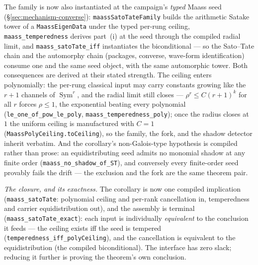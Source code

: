 \documentclass[11pt]{article}
\theoremstyle{definition}
\newcommand{\Sym}{\operatorname{Sym}}
\begin{document}
\medskip
\noindent The family is now also instantiated at the campaign's \emph{typed} Maass
seed (\S\ref{sec:mechanism-converse}): \texttt{maassSatoTateFamily} builds the
arithmetic Satake tower of a \texttt{MaassEigenData} under the typed per-rung
ceiling, \texttt{maass\_temperedness} derives part~(i) at the seed through the
compiled radial limit, and \texttt{maass\_satoTate\_iff} instantiates the
biconditional --- so the Sato--Tate chain and the automorphy chain (packages,
converse, wave-form identification) consume one and the same seed object, with the
same automorphic tower.  Both consequences are derived at their stated strength.  The ceiling enters
polynomially: the per-rung classical input may carry constants growing like the
$r{+}1$ channels of $\Sym^r$, and the radial limit still closes ---
$\rho^r\le C(r{+}1)^k$ for all $r$ forces $\rho\le1$, the exponential beating
every polynomial (\texttt{le\_one\_of\_pow\_le\_poly},
\texttt{maass\_temperedness\_poly}); once the radius closes at $1$ the uniform
ceiling is manufactured with $C=1$
(\texttt{MaassPolyCeiling.toCeiling}), so the family, the fork, and the shadow
detector inherit verbatim.  And the corollary's non-Galois-type hypothesis is
compiled rather than prose: an equidistributing seed admits no monomial shadow
at any finite order (\texttt{maass\_no\_shadow\_of\_ST}), and conversely every
finite-order seed provably fails the drift --- the exclusion and the fork are
the same theorem pair.

\smallskip
\noindent\emph{The closure, and its exactness.}  The corollary is now one
compiled implication (\texttt{maass\_satoTate}: polynomial ceiling and per-rank
cancellation in, temperedness and carrier equidistribution out), and the
assembly is terminal (\texttt{maass\_satoTate\_exact}): each input is
individually \emph{equivalent} to the conclusion it feeds --- the ceiling exists
iff the seed is tempered (\texttt{temperedness\_iff\_polyCeiling}), and the
cancellation is equivalent to the equidistribution (the compiled biconditional).
The interface has zero slack; reducing it further is proving the theorem's own
conclusion.
\end{document}
